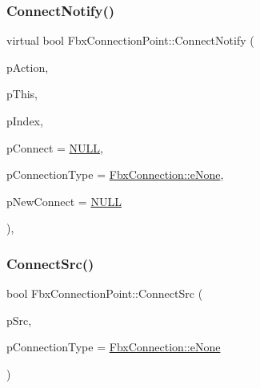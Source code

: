 \subsubsection{\texorpdfstring{Connect\+Notify()}{ConnectNotify()}}
{\footnotesize\ttfamily virtual bool Fbx\+Connection\+Point\+::\+Connect\+Notify (\begin{DoxyParamCaption}\item[{\hyperlink{class_fbx_connection_point_a48ba0c39363bb20be251626acdc6ae5d}{E\+Event}}]{p\+Action,  }\item[{\hyperlink{class_fbx_connection_point}{Fbx\+Connection\+Point} $\ast$}]{p\+This,  }\item[{int}]{p\+Index,  }\item[{\hyperlink{class_fbx_connection_point}{Fbx\+Connection\+Point} $\ast$}]{p\+Connect = {\ttfamily \hyperlink{fbxarch_8h_a070d2ce7b6bb7e5c05602aa8c308d0c4}{N\+U\+LL}},  }\item[{\hyperlink{class_fbx_connection_a3df448a5db356652ab99fd2be2553749}{Fbx\+Connection\+::\+E\+Type}}]{p\+Connection\+Type = {\ttfamily \hyperlink{class_fbx_connection_a3df448a5db356652ab99fd2be2553749a47aa04870c3c0769263e3972e67e9ebe}{Fbx\+Connection\+::e\+None}},  }\item[{\hyperlink{class_fbx_connection_point}{Fbx\+Connection\+Point} $\ast$}]{p\+New\+Connect = {\ttfamily \hyperlink{fbxarch_8h_a070d2ce7b6bb7e5c05602aa8c308d0c4}{N\+U\+LL}} }\end{DoxyParamCaption})\hspace{0.3cm}{\ttfamily [protected]}, {\ttfamily [virtual]}}

\mbox{\label{class_fbx_connection_point_aaae11491b7cd90fbbf9075f98f594e56}} 
\subsubsection{\texorpdfstring{Connect\+Src()}{ConnectSrc()}}
{\footnotesize\ttfamily bool Fbx\+Connection\+Point\+::\+Connect\+Src (\begin{DoxyParamCaption}\item[{\hyperlink{class_fbx_connection_point}{Fbx\+Connection\+Point} $\ast$}]{p\+Src,  }\item[{\hyperlink{class_fbx_connection_a3df448a5db356652ab99fd2be2553749}{Fbx\+Connection\+::\+E\+Type}}]{p\+Connection\+Type = {\ttfamily \hyperlink{class_fbx_connection_a3df448a5db356652ab99fd2be2553749a47aa04870c3c0769263e3972e67e9ebe}{Fbx\+Connection\+::e\+None}} }\end{DoxyParamCaption})}

